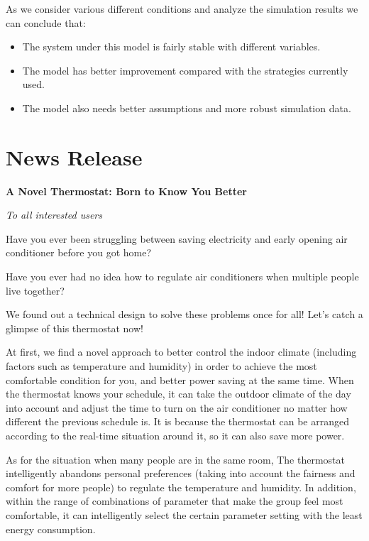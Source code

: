 \documentclass{mcmthesis}
\begin{document}
		As we consider various different conditions and analyze the simulation results we can conclude that:
		
		\begin{itemize}
			\item The system under this model is fairly stable with different variables.
			
			\item The model has better improvement compared with the strategies currently used.
			
			\item The model also needs better assumptions and more robust simulation data.
		\end{itemize}

	\nocite{*}
	
	
	\newpage
	\section{News Release}
	
		
		
		
		\begin{center}
			\Large\textbf{A Novel Thermostat: Born to Know You Better}
			
			\emph{To all interested users}
		\end{center}
		
		Have you ever been struggling between saving electricity and early opening air conditioner before you got home? 
		
		Have you ever had no idea how to regulate air conditioners when multiple people live together?
		
		We found out a technical design to solve these problems once for all! Let’s catch a glimpse of this thermostat now! 
		
		At first, we find a novel approach to better control the indoor climate (including factors such as temperature and humidity) in order to achieve the most comfortable condition for you, and better power saving at the same time. When the thermostat knows your schedule, it can take the outdoor climate of the day into account and adjust the time to turn on the air conditioner no matter how different the previous schedule is. It is because the thermostat can be arranged according to the real-time situation around it, so it can also save more power.
		
		As for the situation when many people are in the same room, The thermostat intelligently abandons personal preferences (taking into account the fairness and comfort for more people) to regulate the temperature and humidity. In addition, within the range of combinations of parameter that make the group feel most comfortable, it can intelligently select the certain parameter setting with the least energy consumption.
		
\end{document}
